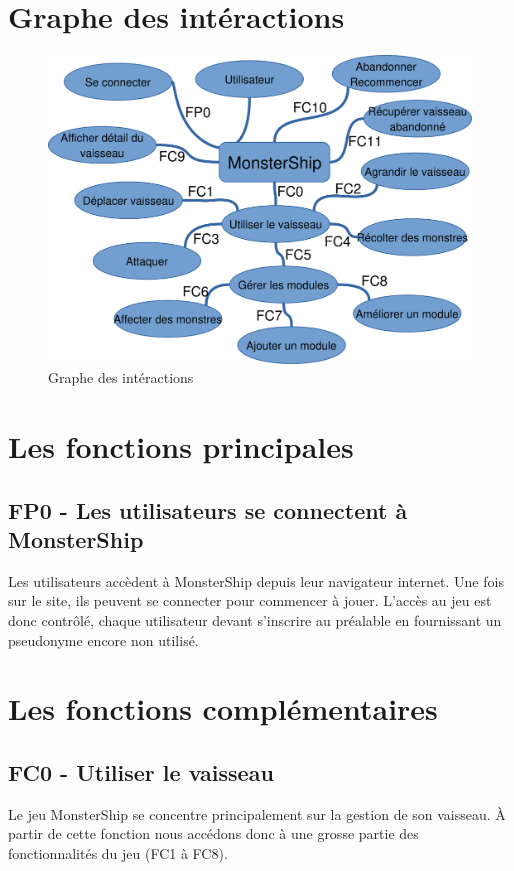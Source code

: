 \documentclass[a4paper,11pt]{report}
\begin{document}
    \section{Graphe des intéractions}
        \begin{figure}[h]
            \begin{center}
                \includegraphics[width=\textwidth]{graphe_interactions/graphe_interactions.png}
                \caption{Graphe des intéractions}
                \label{fig:graphe_interactions}
            \end{center}
        \end{figure}

    \section{Les fonctions principales}
        \subsection{FP0 - Les utilisateurs se connectent à MonsterShip}
            Les utilisateurs accèdent à MonsterShip depuis leur navigateur internet. Une fois sur le site, ils peuvent se connecter pour commencer à jouer. L'accès au jeu est donc contrôlé, chaque utilisateur devant s'inscrire au préalable en fournissant un pseudonyme encore non utilisé.
    
    \section{Les fonctions complémentaires}
        \subsection{FC0 - Utiliser le vaisseau}
            Le jeu MonsterShip se concentre principalement sur la gestion de son vaisseau. À partir de cette fonction nous accédons donc à une grosse partie des fonctionnalités du jeu (FC1 à FC8).
        
\end{document}
